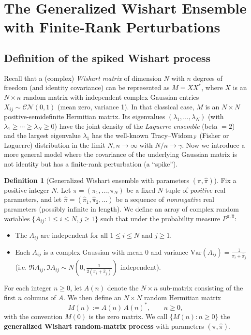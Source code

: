\documentclass[letterpaper,11pt,oneside,reqno]{article}
\numberwithin{equation}{section}
\theoremstyle{definition}
\newtheorem{definition}[proposition]{Definition}
\begin{document}
\section{The Generalized Wishart Ensemble with Finite-Rank Perturbations}
\subsection{Definition of the spiked Wishart process}
Recall that a (complex) \emph{Wishart matrix} of dimension $N$ with $n$ degrees of freedom (and identity covariance) can be represented as $M = X X^*$, where $X$ is an $N\times n$ random matrix with independent complex Gaussian entries $X_{ij}\sim \mathcal{CN}(0,1)$ (mean zero, variance 1). In that classical case, $M$ is an $N\times N$ positive-semidefinite Hermitian matrix. Its eigenvalues $(\lambda_1,\dots,\lambda_N)$ (with $\lambda_1\ge \cdots \ge \lambda_N \ge 0$) have the joint density of the \emph{Laguerre ensemble} (beta $=2$) and the largest eigenvalue $\lambda_1$ has the well-known Tracy--Widom$_{\rm F}$ (Fisher or Laguerre) distribution in the limit $N,n\to\infty$ with $N/n\to\gamma$. Now we introduce a more general model where the covariance of the underlying Gaussian matrix is not identity but has a finite-rank perturbation (a ``spike'').

\begin{definition}[Generalized Wishart ensemble with parameters $(\pi,\hat\pi)$]\label{def:Wishart}
Fix a positive integer $N$. Let $\pi=(\pi_1,\dots,\pi_N)$ be a fixed $N$-tuple of \emph{positive} real parameters, and let $\hat\pi = (\hat\pi_1,\hat\pi_2,\dots)$ be a sequence of \emph{nonnegative} real parameters (possibly infinite in length). We define an array of complex random variables $\{A_{ij}: 1\le i\le N, j\ge 1\}$ such that under the probability measure $P^{\pi,\hat\pi}$:
\begin{itemize}\item The $A_{ij}$ are independent for all $1\le i\le N$ and $j\ge 1$.
\item Each $A_{ij}$ is a complex Gaussian with mean $0$ and variance $\mathrm{Var}(A_{ij}) = \frac{1}{\pi_i + \hat\pi_j}$ (i.e. $\Re A_{ij}, \Im A_{ij} \sim N(0,\frac{1}{2(\pi_i+\hat\pi_j)})$ independent).
\end{itemize}
For each integer $n\ge 0$, let $A(n)$ denote the $N\times n$ sub-matrix consisting of the first $n$ columns of $A$. We then define an $N\times N$ random Hermitian matrix
\[ M(n) := A(n)\,A(n)^*, \qquad n\ge 0, \]
with the convention $M(0)$ is the zero matrix. We call $\{M(n): n\ge 0\}$ the \textbf{generalized Wishart random-matrix process} with parameters $(\pi,\hat\pi)$.
\end{definition}
\end{document}
